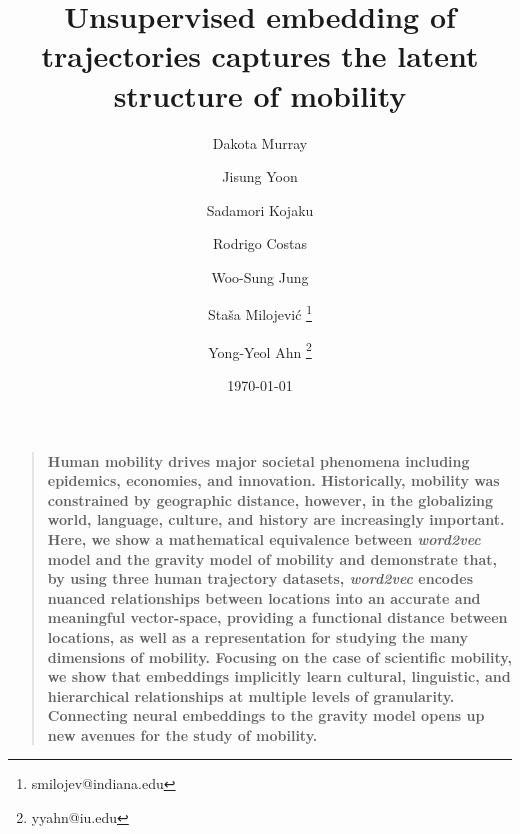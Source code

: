 \documentclass[12pt]{article} %
\newenvironment{sciabstract}{%
\begin{quote} \bf}
{\end{quote}}
\begin{document}
\title{Unsupervised embedding of trajectories captures the latent structure of mobility} %
\author[1,\Yinyang]{Dakota Murray}
\author[1,2,\Yinyang]{Jisung Yoon}
\author[1]{Sadamori Kojaku}
\author[3,4]{Rodrigo Costas}
\author[2,5,6]{Woo-Sung Jung}
\author[1]{Staša Milojević \thanks{smilojev@indiana.edu}}
\author[1,7,8]{Yong-Yeol Ahn \thanks{yyahn@iu.edu}}



\date{\today}


\baselineskip24pt


\maketitle %

%
%
\newpage
\begin{sciabstract}
	Human mobility drives major societal phenomena including epidemics, economies, and innovation.
	Historically, mobility was constrained by geographic distance, however, in the globalizing world, language, culture, and history are increasingly important.
	Here, we show a mathematical equivalence between \textit{word2vec} model and the gravity model of mobility and demonstrate that, by using three human trajectory datasets, \textit{word2vec} encodes nuanced relationships between locations into an accurate and meaningful vector-space, providing a functional distance between locations, as well as a representation for studying the many dimensions of mobility.
	Focusing on the case of scientific mobility, we show that embeddings implicitly learn cultural, linguistic, and hierarchical relationships at multiple levels of granularity.
	Connecting neural embeddings to the gravity model opens up new avenues for the study of mobility.
\end{sciabstract}
\end{document}

